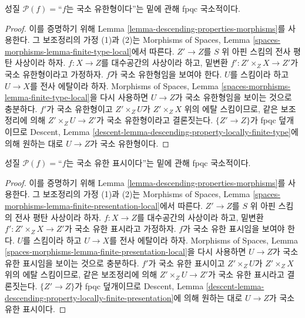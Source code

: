 \begin{lemma}
\label{lemma-descending-property-locally-finite-type}
성질 $\mathcal{P}(f)=$``$f$는 국소 유한형이다''는 밑에 관해 fpqc
국소적이다.
\end{lemma}

\begin{proof}
이를 증명하기 위해 Lemma \ref{lemma-descending-properties-morphisms}를
사용한다. 그 보조정리의 가정 (1)과 (2)는 Morphisms of Spaces, Lemma
\ref{spaces-morphisms-lemma-finite-type-local}에서 따른다. $Z'\to Z$를
$S$ 위 아핀 스킴의 전사 평탄 사상이라 하자. $f:X\to Z$를 대수공간의
사상이라 하고, 밑변환 $f':Z'\times_ZX\to Z'$가 국소 유한형이라고
가정하자. $f$가 국소 유한형임을 보여야 한다. $U$를 스킴이라 하고
$U\to X$를 전사 에탈이라 하자. Morphisms of Spaces, Lemma
\ref{spaces-morphisms-lemma-finite-type-local}을 다시 사용하면
$U\to Z$가 국소 유한형임을 보이는 것으로 충분하다. $f'$가 국소
유한형이고 $Z'\times_ZU$가 $Z'\times_ZX$ 위의 에탈 스킴이므로, 같은
보조정리에 의해 $Z'\times_ZU\to Z'$가 국소 유한형이라고 결론짓는다.
$\{Z'\to Z\}$가 fpqc 덮개이므로 Descent, Lemma
\ref{descent-lemma-descending-property-locally-finite-type}에 의해 원하는
대로 $U\to Z$가 국소 유한형이다.
\end{proof}

\begin{lemma}
\label{lemma-descending-property-locally-finite-presentation}
성질 $\mathcal{P}(f)=$``$f$는 국소 유한 표시이다''는 밑에 관해 fpqc
국소적이다.
\end{lemma}

\begin{proof}
이를 증명하기 위해 Lemma \ref{lemma-descending-properties-morphisms}를
사용한다. 그 보조정리의 가정 (1)과 (2)는 Morphisms of Spaces, Lemma
\ref{spaces-morphisms-lemma-finite-presentation-local}에서 따른다.
$Z'\to Z$를 $S$ 위 아핀 스킴의 전사 평탄 사상이라 하자. $f:X\to Z$를
대수공간의 사상이라 하고, 밑변환 $f':Z'\times_ZX\to Z'$가 국소 유한
표시라고 가정하자. $f$가 국소 유한 표시임을 보여야 한다. $U$를
스킴이라 하고 $U\to X$를 전사 에탈이라 하자. Morphisms of Spaces,
Lemma \ref{spaces-morphisms-lemma-finite-presentation-local}을 다시 사용하면
$U\to Z$가 국소 유한 표시임을 보이는 것으로 충분하다. $f'$가 국소
유한 표시이고 $Z'\times_ZU$가 $Z'\times_ZX$ 위의 에탈 스킴이므로,
같은 보조정리에 의해 $Z'\times_ZU\to Z'$가 국소 유한 표시라고
결론짓는다. $\{Z'\to Z\}$가 fpqc 덮개이므로 Descent, Lemma
\ref{descent-lemma-descending-property-locally-finite-presentation}에 의해
원하는 대로 $U\to Z$가 국소 유한 표시이다.
\end{proof}

